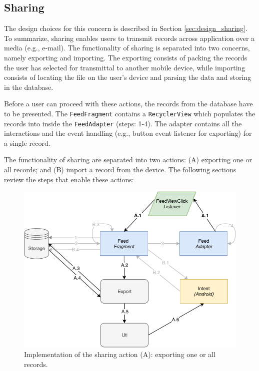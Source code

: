 \subsection{Sharing}

The design choices for this concern is described in Section \ref{sec:design_sharing}. To summarize, sharing enables users to transmit records across application over a media (e.g., e-mail). The functionality of sharing is separated into two concerns, namely exporting and importing. The exporting consists of packing the records the user has selected for transmittal to another mobile device, while importing consists of locating the file on the user's device and parsing the data and storing in the database.

Before a user can proceed with these actions, the records from the database have to be presented. The \verb|FeedFragment| contains a \verb|RecyclerView| which populates the records into inside the \verb|FeedAdapter| (steps: 1-4). The adapter contains all the interactions and the event handling (e.g., button event listener for exporting) for a single record. 

The functionality of sharing are separated into two actions: (A) exporting one or all records; and (B) import a record from the device. The following sections review the steps that enable these actions:


\begin{figure}
    \centering
    \includegraphics[scale=0.7]{images/Sharing_ImpA.pdf}
    \caption{Implementation of the sharing action (A): exporting one or all records.}
    \label{fig:impl_sharingA}
\end{figure}

